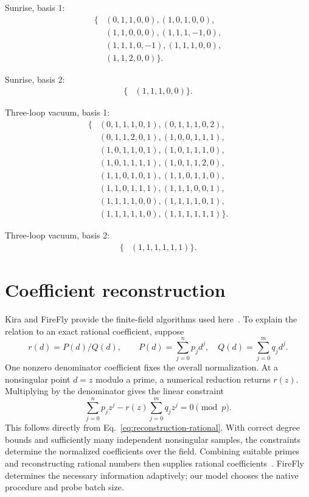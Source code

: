 Sunrise, basis 1:\[\begin{aligned}\{&(0,1,1,0,0),(1,0,1,0,0),\\&(1,1,0,0,0),(1,1,1,-1,0),\\&(1,1,1,0,-1),(1,1,1,0,0),\\&(1,1,2,0,0)\}.\end{aligned}\]

Sunrise, basis 2:\[\begin{aligned}\{&(1,1,1,0,0)\}.\end{aligned}\]

Three-loop vacuum, basis 1:\[\begin{aligned}\{&(0,1,1,1,0,1),(0,1,1,1,0,2),\\&(0,1,1,2,0,1),(1,0,0,1,1,1),\\&(1,0,1,1,0,1),(1,0,1,1,1,0),\\&(1,0,1,1,1,1),(1,0,1,1,2,0),\\&(1,1,0,1,0,1),(1,1,0,1,1,0),\\&(1,1,0,1,1,1),(1,1,1,0,0,1),\\&(1,1,1,1,0,0),(1,1,1,1,0,1),\\&(1,1,1,1,1,0),(1,1,1,1,1,1)\}.\end{aligned}\]

Three-loop vacuum, basis 2:\[\begin{aligned}\{&(1,1,1,1,1,1)\}.\end{aligned}\]


\section{Coefficient reconstruction}
\label{app:reconstruction-algebra}
Kira and FireFly provide the finite-field algorithms used here~\cite{Kira2,FireFly2019,FireFly2020}. To explain the relation to an exact rational coefficient, suppose
\begin{equation}
 r(d)=P(d)/Q(d),\qquad
 P(d)=\sum_{j=0}^{n}p_jd^j,\quad Q(d)=\sum_{j=0}^{m}q_jd^j.
 \label{eq:reconstruction-rational}
\end{equation}
One nonzero denominator coefficient fixes the overall normalization. At a nonsingular point $d=z$ modulo a prime, a numerical reduction returns $r(z)$. Multiplying by the denominator gives the linear constraint
\begin{equation}
 \sum_{j=0}^{n}p_jz^j-r(z)\sum_{j=0}^{m}q_jz^j=0\pmod p.
 \label{eq:reconstruction-sample}
\end{equation}
This follows directly from Eq.~\eqref{eq:reconstruction-rational}. With correct degree bounds and sufficiently many independent nonsingular samples, the constraints determine the normalized coefficients over the field. Combining suitable primes and reconstructing rational numbers then supplies rational coefficients~\cite{FireFly2019,FireFly2020}. FireFly determines the necessary information adaptively; our model chooses the native procedure and probe batch size.

